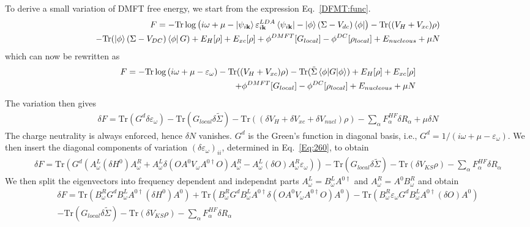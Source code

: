 \documentclass[aps,prb,floatfix,epsfig,singlecolumn,showpacs,preprintnumbers]{revtex4}
\newcommand{\vk}{{\mathbf{k}}}
\newcommand{\Tr}{\mathrm{Tr}}
\begin{document}
To derive a small variation of DMFT free energy, we start from the expression Eq.~\ref{DFMT:func}.
\begin{eqnarray}
F = -\Tr\log\left( i\omega+\mu
-\ket{\psi_{i\vk}}\varepsilon^{LDA}_{i\vk}\bra{\psi_{i\vk}}
-\ket{\phi}(\Sigma-V_{dc})\bra{\phi} \right) 
- \Tr((V_H+V_{xc})\rho) \nonumber\\
- \Tr( \ket{\phi}(\Sigma-V_{DC})\bra{\phi} G)
+ E_{H}[\rho]+E_{xc}[\rho] 
+ \phi^{DMFT}[G_{local}]-\phi^{DC}[\rho_{local}] 
+ E_{nucleous}+\mu N
\end{eqnarray}
which can now be rewritten as
\begin{eqnarray}
F = -\Tr\log\left( i\omega+\mu-\varepsilon_\omega\right)
- \Tr((V_H+V_{xc})\rho) 
- \Tr( \tilde{\Sigma}\braket{\phi| G|\phi})
+ E_{H}[\rho]+E_{xc}[\rho] \nonumber\\
+ \phi^{DMFT}[G_{local}]-\phi^{DC}[\rho_{local}] 
+ E_{nucleous}+\mu N
\end{eqnarray}
The variation then gives
\begin{eqnarray}
\delta F = \Tr(G^d \delta\varepsilon_\omega)
- \Tr( G_{local}\delta \tilde{\Sigma})
- \Tr((\delta V_H+\delta V_{xc}+\delta V_{nucl})\rho) 
-\sum_\alpha F^{HF}_\alpha \delta R_\alpha + \mu\delta N
\end{eqnarray}
The charge neutrality is always enforced, hence $\delta N$ vanishes.
$G^d$ is the Green's function in diagonal basis, i.e., $G^d=1/(i\omega+\mu-\varepsilon_\omega)$.
We then insert the diagonal components of variation
$(\delta\varepsilon_\omega)_{ii}$, determined in Eq.~\ref{Eq:260}, to obtain
\begin{eqnarray}
\delta F = 
\Tr\left(G^d (A^L_\omega(\delta H^0)A^R_\omega + A^L_\omega\delta(O A^0 V_\omega A^{0\dagger} O)A^R_\omega 
- A^L_\omega(\delta  O) A^R_\omega\varepsilon_\omega )
\right)
- \Tr( G_{local}\delta \tilde{\Sigma})
- \Tr(\delta V_{KS}\rho) 
-\sum_\alpha F^{HF}_\alpha \delta R_\alpha
\nonumber
\end{eqnarray}
We then split the eigenvectors into frequency dependent and independnt
parts $A^L_\omega=B^L_\omega A^{0\dagger}$ and $A^R_\omega=A^0
B^R_\omega$ and obtain
\begin{eqnarray}
\delta F = 
\Tr\left( B^R_\omega G^d B^L_\omega A^{0\dagger}(\delta  H^0)A^0 \right)
+\Tr\left(B^R_\omega G^d B^L_\omega A^{0\dagger}\delta(O A^0 V_\omega A^{0\dagger} O)A^0 \right)
-\Tr\left(B^R_\omega\varepsilon_\omega G^d B^L_\omega A^{0\dagger}(\delta  O) A^0 \right)
\\
- \Tr( G_{local}\delta \tilde{\Sigma})
- \Tr(\delta V_{KS}\rho) 
-\sum_\alpha F^{HF}_\alpha \delta R_\alpha
\nonumber
\end{eqnarray}
\end{document}
